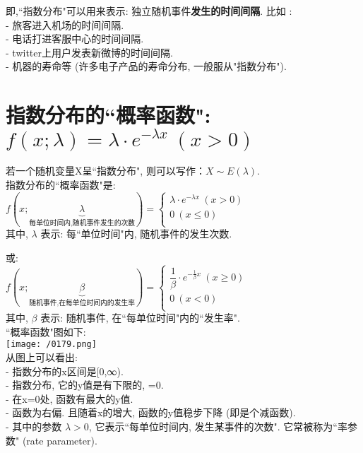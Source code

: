 \documentclass[UTF8]{ctexart}
\begin{document}
即,``指数分布"可以用来表示: 独立随机事件\textbf{发生的时间间隔}. 比如 : \\
- 旅客进入机场的时间间隔. \\
- 电话打进客服中心的时间间隔. \\
- twitter上用户发表新微博的时间间隔. \\
- 机器的寿命等 (许多电子产品的寿命分布, 一般服从"指数分布"). \\









\section{指数分布的``概率函数": $\boxed{f\left( x;\lambda \right) =\lambda \cdot e^{-\lambda x}\ (x>0)		}$}


若一个随机变量X呈``指数分布", 则可以写作：$\boxed{X \sim E(\lambda)}$. \\

  
指数分布的``概率函数"是: \\
$\boxed{
f\left( x;\underset{\text{每单位时间内,随机事件发生的次数}}{\underbrace{\lambda }} \right) =\left\{ \begin{array}{l}
	\lambda \cdot e^{-\lambda x}\ (x>0)\\
	0\ (x\leq 0)\\
\end{array} \right. 
}$ \\
其中, $\lambda$ 表示: 每``单位时间"内, 随机事件的发生次数. 

或: \\
$ \boxed{
f\left( x;\underset{\text{随机事件,在每单位时间内的发生率}}{\underbrace{\beta }} \right) =\left\{ \begin{array}{l}
	\dfrac{1}{\beta}\cdot e^{-\frac{1}{\beta}x}\ (x\ge 0)\\
	0\ (x<0)\\
\end{array} \right. 
}$  \\
其中, $\beta$ 表示: 随机事件, 在``每单位时间"内的``发生率".\\
 
 
``概率函数"图如下: \\
 \texttt{[image: /0179.png]} \\

从图上可以看出: \\
- 指数分布的x区间是[0,∞). \\
- 指数分布, 它的y值是有下限的, =0. \\
- 在x=0处, 函数有最大的y值. \\
- 函数为右偏. 且随着x的增大, 函数的y值稳步下降 (即是个减函数). \\
- 其中的参数 $\lambda >0$, 它表示``每单位时间内, 发生某事件的次数". 它常被称为``率参数" (rate parameter). \\
\end{document}
